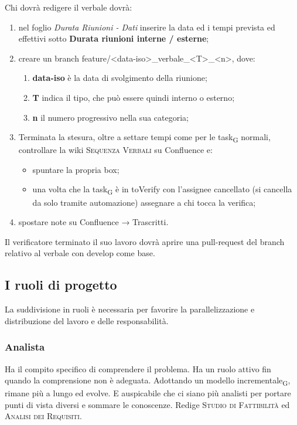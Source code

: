     	Chi dovrà redigere il verbale dovrà:
    	\begin{enumerate}
    		\item nel foglio \textit{Durata Riunioni - Dati} inserire la data ed i tempi prevista ed effettivi  sotto \textbf{Durata riunioni interne / esterne};
    		\item creare un branch feature/<data-iso>\_verbale\_<T>\_<n>, dove:
            \begin{enumerate}
                \item \textbf{data-iso} è la data di svolgimento della riunione;
                \item \textbf{T} indica il tipo, che può essere quindi interno o esterno;
                \item \textbf{n} il numero progressivo nella sua categoria;
            \end{enumerate}
    		\item Terminata la stesura, oltre a settare tempi come per le task\textsubscript{G} normali, controllare la wiki \textsc{Sequenza Verbali} su Confluence e:
    		\begin{itemize}
    			\item spuntare la propria box;
    			\item una volta che la task\textsubscript{G} è in toVerify con l’assignee cancellato (si cancella da solo tramite automazione) assegnare a chi tocca la verifica;
    		\end{itemize}
    		\item spostare note su Confluence → Trascritti.
    	\end{enumerate}
        Il verificatore terminato il suo lavoro dovrà aprire una pull-request del branch relativo al verbale con develop come base.

\subsection{I ruoli di progetto}
    La suddivisione in ruoli è necessaria per favorire la parallelizzazione e distribuzione del lavoro e delle responsabilità.
    \subsubsection{Analista}
    Ha il compito specifico di comprendere il problema. Ha un ruolo attivo fin quando la comprensione non è adeguata. Adottando un modello incrementale\textsubscript{G}, rimane più a lungo ed evolve. E auspicabile che ci siano più analisti per portare punti di vista diversi e sommare le conoscenze. Redige \textsc{Studio di Fattibilità} ed \textsc{Analisi dei Requisiti}.
